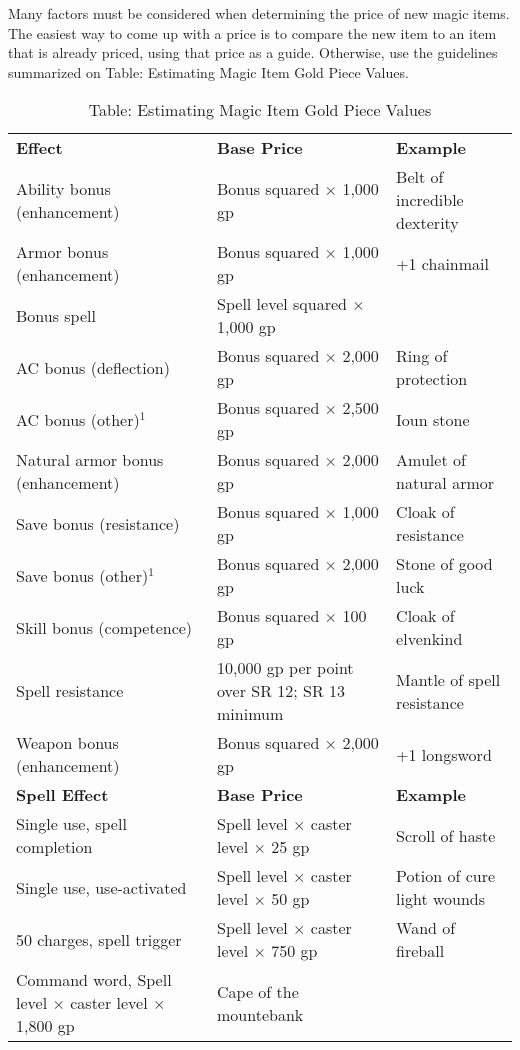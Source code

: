 				
Many factors must be considered when determining the price of new magic items. The easiest way to come up with a price is to compare the new item to an item that is already priced, using that price as a guide. Otherwise, use the guidelines summarized on Table: Estimating Magic Item Gold Piece Values.
\begin{table*}[]
\sffamily
\caption{Table: Estimating Magic Item Gold Piece Values}
\begin{tabular}{lll}
\textbf{Effect} & \textbf{Base Price} & \textbf{Example}\\
Ability bonus (enhancement) & Bonus squared $\times$ 1,000 gp & Belt of incredible dexterity \\
 Armor bonus (enhancement) & Bonus squared $\times$ 1,000 gp & +1 chainmail \\
 Bonus spell & Spell level squared $\times$ 1,000 gp &   \\
 AC bonus (deflection) & Bonus squared $\times$ 2,000 gp & Ring of protection \\
 AC bonus (other)\(^{1}\) & Bonus squared $\times$ 2,500 gp & Ioun stone \\
 Natural armor bonus (enhancement) & Bonus squared $\times$ 2,000 gp & Amulet of natural armor \\
 Save bonus (resistance) & Bonus squared $\times$ 1,000 gp & Cloak of resistance \\
 Save bonus (other)\(^{1}\) & Bonus squared $\times$ 2,000 gp & Stone of good luck \\
 Skill bonus (competence) & Bonus squared $\times$ 100 gp & Cloak of elvenkind \\
 Spell resistance & 10,000 gp per point over SR 12; SR 13 minimum & Mantle of spell resistance \\
 Weapon bonus (enhancement) & Bonus squared $\times$ 2,000 gp & +1 longsword\\
\textbf{Spell Effect} &  \textbf{Base Price} & \textbf{Example}\\
Single use, spell completion & Spell level $\times$ caster level $\times$ 25 gp & Scroll of haste \\
 Single use, use-activated & Spell level $\times$ caster level $\times$ 50 gp & Potion of cure light wounds \\
 50 charges, spell trigger & Spell level $\times$ caster level $\times$ 750 gp & Wand of fireball \\
 Command word, Spell level $\times$ caster level $\times$ 1,800 gp & Cape of the mountebank \\

\end{tabular}
\end{table*}
